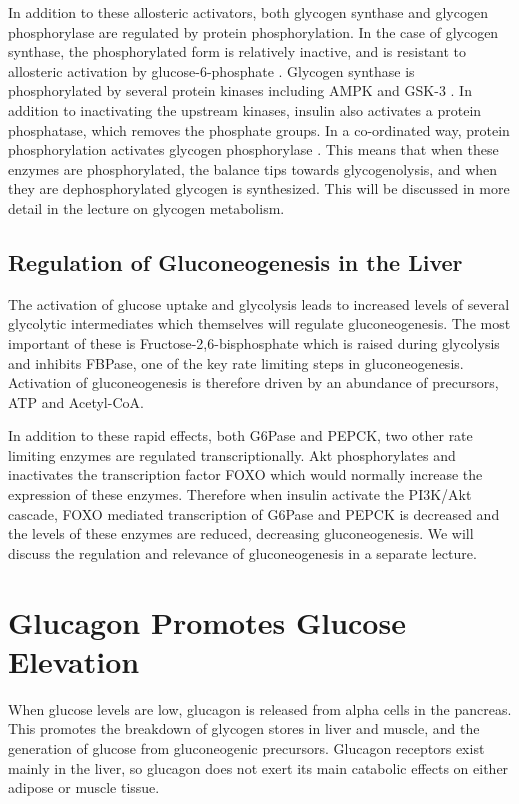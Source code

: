 \documentclass{tufte-handout}
\begin{document}
In addition to these allosteric activators, both glycogen synthase and glycogen phosphorylase are regulated by protein phosphorylation.  In the case of glycogen synthase, the phosphorylated form is relatively inactive, and is resistant to allosteric activation by glucose-6-phosphate \cite{Friedman1963}.  Glycogen synthase is phosphorylated by several protein kinases including AMPK and GSK-3 \cite{Parker1982}.  In addition to inactivating the upstream kinases, insulin also activates a protein phosphatase, which removes the phosphate groups.  In a co-ordinated way, protein phosphorylation activates glycogen phosphorylase \cite{Krebs1964}.  This means that when these enzymes are phosphorylated, the balance tips towards glycogenolysis, and when they are dephosphorylated glycogen is synthesized.  This will be discussed in more detail in the lecture on glycogen metabolism.

\subsection{Regulation of Gluconeogenesis in the Liver}

The activation of glucose uptake and glycolysis leads to increased levels of several glycolytic intermediates which themselves will regulate gluconeogenesis.  The most important of these is Fructose-2,6-bisphosphate which is raised during glycolysis and inhibits FBPase, one of the key rate limiting steps in gluconeogenesis.  Activation of gluconeogenesis is therefore driven by an abundance of precursors, ATP and Acetyl-CoA.

In addition to these rapid effects, both G6Pase and PEPCK, two other rate limiting enzymes are regulated transcriptionally.  Akt phosphorylates and inactivates the transcription factor FOXO which would normally increase the expression of these enzymes.  Therefore when insulin activate the PI3K/Akt cascade, FOXO mediated transcription of G6Pase and PEPCK is decreased and the levels of these enzymes are reduced, decreasing gluconeogenesis.  We will discuss the regulation and relevance of gluconeogenesis in a separate lecture.

\section{Glucagon Promotes Glucose Elevation}

 When glucose levels are low, glucagon is released from alpha cells in the pancreas.  This promotes the breakdown of glycogen stores in liver and muscle, and the generation of glucose from gluconeogenic precursors.  Glucagon receptors exist mainly in the liver, so glucagon does not exert its main catabolic effects on either adipose or muscle tissue. 
\end{document}
